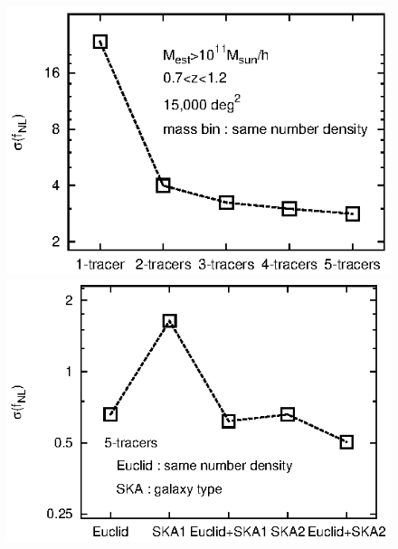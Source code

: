 \begin{enumerate}
\begin{description}
\begin{figure}[t]
 \begin{minipage}{0.52\hsize}
 \begin{center}
   \includegraphics[width=1.0\linewidth]{cosmology/sigma_fNL_nTracer.eps} 
 \end{center}
 \end{minipage}
 \begin{minipage}{0.52\hsize}
 \begin{center}
   \includegraphics[width=1.0\linewidth]{cosmology/sigma_fNL_survey.eps} 
 \end{center}

\end{minipage}
\end{figure}
\end{description}
\end{enumerate}
